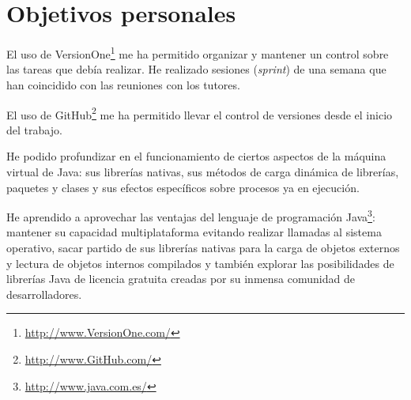 \section{Objetivos personales}


El uso de VersionOne\footnote{\url{http://www.VersionOne.com/}} me ha permitido organizar y mantener un control sobre las tareas que debía realizar. He realizado sesiones (\textit{sprint}) de una semana que han coincidido con las reuniones con los tutores.

El uso de GitHub\footnote{\url{http://www.GitHub.com/}} me ha permitido llevar el control de versiones desde el inicio del trabajo.

He podido profundizar en el funcionamiento de ciertos aspectos de la máquina virtual de Java: sus librerías nativas, sus métodos de carga dinámica de librerías, paquetes y clases y sus efectos específicos sobre procesos ya en ejecución.

He aprendido a aprovechar las ventajas del lenguaje de programación Java\footnote{\url{http://www.java.com.es/}}: mantener su capacidad multiplataforma evitando realizar llamadas al sistema operativo, sacar partido de sus librerías nativas para la carga de objetos externos y lectura de objetos internos compilados y también explorar las posibilidades de librerías Java de licencia gratuita creadas por su inmensa comunidad de desarrolladores.

